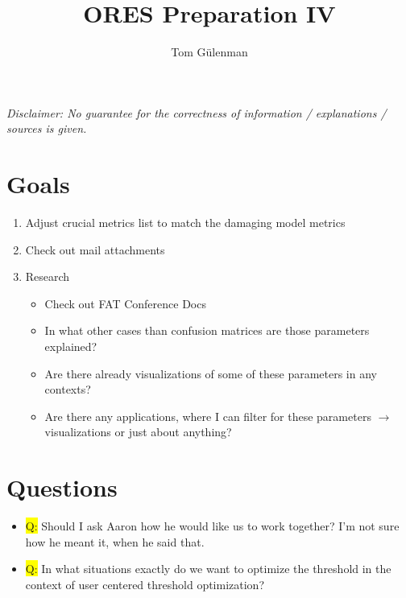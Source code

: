 \documentclass[12pt,a4paper]{article}
\title{ORES Preparation IV}
\author{Tom Gülenman}
\begin{document}
\maketitle
\textit{Disclaimer: No guarantee for the correctness of information / explanations / sources is given.}\\
\section*{Goals}
\begin{enumerate}
\item Adjust crucial metrics list to match the damaging model metrics
\item Check out mail attachments
\item Research
\begin{itemize}
\item Check out FAT Conference Docs
\item In what other cases than confusion matrices are those parameters explained?
\item Are there already visualizations of some of these parameters in any contexts?
\item Are there any applications, where I can filter for these parameters $\rightarrow$ visualizations or just about anything?
\end{itemize}
\end{enumerate}

\section*{Questions}
\begin{itemize}
%
\item \colorbox{yellow}{Q:} Should I ask Aaron how he would like us to work together? I'm not sure how he meant it, when he said that.
%
\item \colorbox{yellow}{Q:} In what situations exactly do we want to optimize the threshold in the context of user centered threshold optimization?
\end{itemize}
\end{document}
